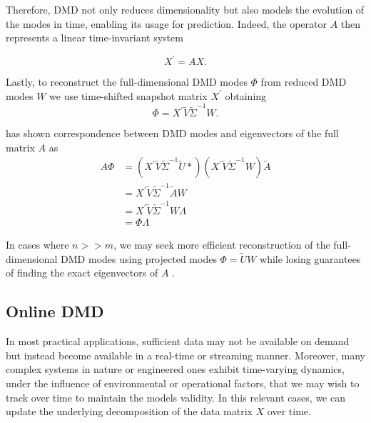Therefore, DMD not only reduces dimensionality but also models the evolution of the modes in time, enabling its usage for prediction\citep{Brunton2022}. Indeed, the operator \(A\) then represents a linear time-invariant system

\begin{equation*}
	X^\prime = AX.
\end{equation*}

Lastly, to reconstruct the full-dimensional DMD modes \(\Phi \) from reduced DMD modes \(W\) we use time-shifted snapshot matrix \(X^\prime \) obtaining
\begin{equation}\label{eq:full-dmd-modes}
	\Phi = X^\prime \tilde{V} \tilde{\Sigma}^{-1} W.
\end{equation}

\citet{Tu2013} has shown correspondence between DMD modes and eigenvectors of the full matrix \(A\) as
\begin{align*}
	A\Phi
	 & = (X^\prime \tilde{V} \tilde{\Sigma}^{-1} \tilde{U}*) (X^\prime \tilde{V} \tilde{\Sigma}^{-1} W)
	\tilde{A}                                                                                           \\
	 & = X^\prime \tilde{V} \tilde{\Sigma}^{-1} \tilde{A} W                                             \\
	 & = X^\prime \tilde{V} \tilde{\Sigma}^{-1} W \Lambda                                               \\
	 & = \Phi \Lambda
\end{align*}

In cases where \(n >> m\), we may seek more efficient reconstruction of the full-dimensional DMD modes using projected modes \(\Phi = \tilde{U} W\) while losing guarantees of finding the exact eigenvectors of \(A\) \citep{Schmid2010}.

\subsection{Online DMD}
In most practical applications, sufficient data may not be available on demand but instead become available in a real-time or streaming manner. Moreover, many complex systems in nature or engineered ones exhibit time-varying dynamics, under the influence of environmental or operational factors, that we may wish to track over time to maintain the models validity. In this relevant cases, we can update the underlying decomposition of the data matrix \(X\) over time.

